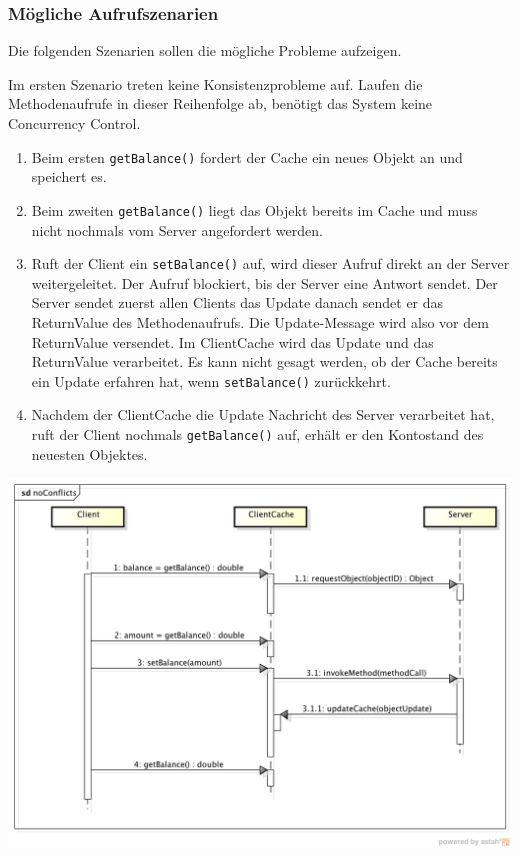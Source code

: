 \subsubsection{Mögliche Aufrufszenarien}
\label{sec:mogl-aufr}

 Die folgenden Szenarien sollen die mögliche Probleme aufzeigen.

Im ersten Szenario treten keine Konsistenzprobleme auf. Laufen die Methodenaufrufe in dieser Reihenfolge ab, benötigt das System keine Concurrency Control.
\begin{enumerate}
\item Beim ersten \verb|getBalance()| fordert der Cache ein neues Objekt an und speichert es.
\item Beim zweiten \verb|getBalance()|  liegt das Objekt bereits im Cache und muss nicht nochmals vom Server angefordert werden.
\item Ruft der Client ein \verb|setBalance()| auf, wird dieser Aufruf direkt an der Server weitergeleitet. Der Aufruf blockiert, bis der Server eine Antwort sendet. Der Server sendet zuerst allen Clients das Update danach sendet er das ReturnValue des Methodenaufrufs. Die Update-Message wird also vor dem ReturnValue versendet. Im ClientCache wird das Update und das ReturnValue verarbeitet. Es kann nicht gesagt werden, ob der Cache bereits ein Update erfahren hat, wenn  \verb|setBalance()|  zurückkehrt.
\item Nachdem der ClientCache die Update Nachricht des Server verarbeitet hat, ruft der Client nochmals \verb|getBalance()| auf, erhält er den Kontostand des neuesten Objektes.
\end{enumerate}

\includegraphics[scale=0.3]{image_testFramework/conflictscenario_noconflict}


